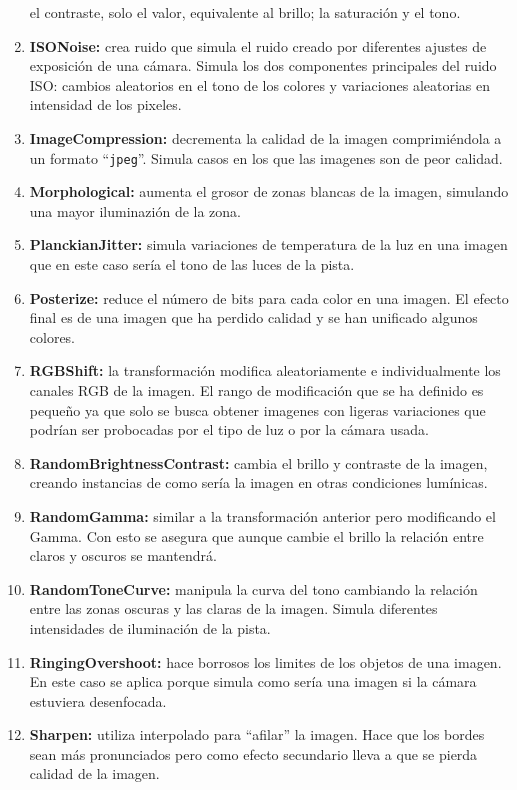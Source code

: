 \documentclass[12pt]{report} %
\begin{document}
\begin{enumerate}
    el contraste, solo el valor, equivalente al brillo; la saturación y el
    tono.
    \item \textbf{ISONoise:} crea ruido que simula el ruido creado por
    diferentes ajustes de exposición de una cámara.  Simula los dos componentes
    principales del ruido ISO: cambios aleatorios en el tono de los colores y
    variaciones aleatorias en intensidad de los pixeles.
    \item \textbf{ImageCompression:} decrementa la calidad de la imagen
    comprimiéndola a un formato ``\verb!jpeg!''. Simula casos en los que las imagenes
    son de peor calidad.
    \item \textbf{Morphological:} aumenta el grosor de
    zonas blancas de la imagen, simulando una mayor iluminazión de la zona.
    \item \textbf{PlanckianJitter:} simula variaciones de temperatura de la luz
    en una imagen que en este caso sería el tono de las luces de la pista.
    \item \textbf{Posterize:} reduce el número de bits para cada color en una
    imagen. El efecto final es de una imagen que ha perdido calidad y se han
    unificado algunos colores.
    \item \textbf{RGBShift:} la transformación
    modifica aleatoriamente e individualmente los canales RGB de la imagen.  El
    rango de modificación que se ha definido es pequeño ya que solo se busca
    obtener imagenes con ligeras variaciones que podrían ser probocadas por el
    tipo de luz o por la cámara usada.
    \item \textbf{RandomBrightnessContrast:} cambia el brillo y contraste de la
    imagen, creando instancias de como sería la imagen en otras condiciones
    lumínicas.
    \item \textbf{RandomGamma:} similar a la transformación
    anterior pero modificando el Gamma. Con esto se asegura que aunque cambie
    el brillo la relación entre claros y oscuros se mantendrá.
    \item \textbf{RandomToneCurve:} manipula la curva del tono cambiando la relación
    entre las zonas oscuras y las claras de la imagen. Simula diferentes
    intensidades de iluminación de la pista.
    \item \textbf{RingingOvershoot:}
    hace borrosos los limites de los objetos de una imagen. En este caso se
    aplica porque simula como sería una imagen si la cámara estuviera
    desenfocada.
    \item \textbf{Sharpen:} utiliza interpolado para ``afilar'' la
    imagen. Hace que los bordes sean más pronunciados pero como efecto
    secundario lleva a que se pierda calidad de la imagen.
    \end{enumerate}
\end{document}
